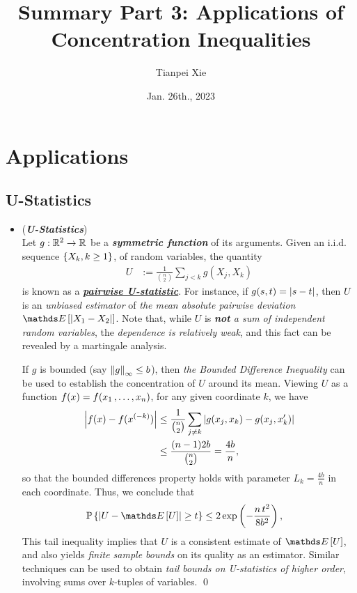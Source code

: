 \documentclass[11pt]{article}
\begin{document}
\title{Summary Part 3: Applications of Concentration Inequalities}
\author{ Tianpei Xie}
\date{Jan. 26th., 2023 }
\maketitle
\tableofcontents
\newpage
\section{Applications}
\subsection{U-Statistics}
\begin{itemize}
\item \begin{example} (\textbf{\emph{U-Statistics}}) \citep{wainwright2019high}\\
Let $g: {\mathbb R}^2 \to {\mathbb R}$ be a \emph{\textbf{symmetric function}} of its arguments. Given an i.i.d. sequence $\left\{X_k, k \ge 1\right\}$, of random variables, the quantity
\begin{align}
U&:= \frac{1}{{n \choose 2}}\sum_{j < k}g(X_j, X_k)\label{def: u_stats}
\end{align} is known as a \underline{\emph{\textbf{pairwise U-statistic}}}. For instance, if $g(s, t) = \left\lvert s - t \right\rvert$, then $U$ is an \emph{unbiased estimator} of \emph{the mean absolute pairwise deviation $\E{}{\abs{X_1 - X_2}}$}. 
Note that, while $U$ is \emph{\textbf{not} a sum of independent random variables}, the \emph{dependence is relatively weak}, and this fact can be revealed by a martingale analysis. 

If $g$ is bounded (say $\left\|g\right\|_{\infty} \le b$), then \emph{the Bounded Difference Inequality} can be used to establish the concentration of $U$ around its mean. Viewing $U$ as a function $f(x) = f(x_1 \,{,}\ldots{,}\, x_n)$, for any given coordinate $k$, we have
\begin{align*}
\left\lvert f(x) - f(x^{(-k)}) \right\rvert &\le  \frac{1}{{n \choose 2}}\sum_{j \neq k}\left\lvert g(x_j, x_k) - g(x_j, x_k') \right\rvert \\
&\le \frac{(n-1) 2b }{{n \choose 2}} = \frac{4b}{n},
\end{align*} so that the bounded differences property holds with parameter $L_k = \frac{4b}{n}$ in each coordinate. Thus, we conclude that
\begin{align*}
\bP\set{\abs{U - \E{}{U}} \ge t} &\le 2 \exp\paren{-\frac{n\,t^2}{8 b^2}},
\end{align*} This tail inequality implies that $U$ is a consistent estimate of $\E{}{U}$, and also yields \emph{finite sample bounds} on its quality as an estimator. Similar techniques can be used to obtain \emph{tail bounds on U-statistics of higher order}, involving sums over $k$-tuples of variables. \qed
\end{example}
\end{itemize}
\end{document}
